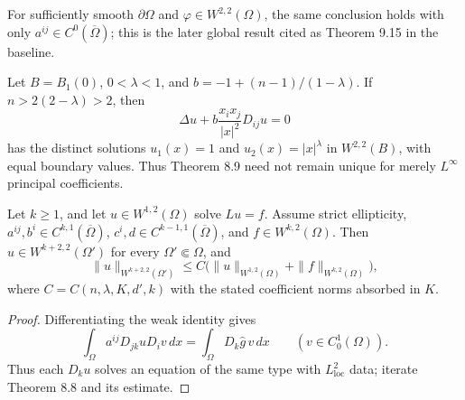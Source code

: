 \begin{remark}
\label{gt-rem-8-continuous-principal-coefficients}
For sufficiently smooth $\partial\Omega$ and $\varphi\in W^{2,2}(\Omega)$,
the same conclusion holds with only $a^{ij}\in C^0(\overline\Omega)$; this is
the later global result cited as Theorem 9.15 in the baseline.
\end{remark}

\begin{example}
\label{gt-ex-8-discontinuous-principal-nonuniqueness}
Let $B=B_1(0)$, $0<\lambda<1$, and
$b=-1+(n-1)/(1-\lambda)$. If $n>2(2-\lambda)>2$, then
\begin{equation}
\Delta u+b\frac{x_ix_j}{|x|^2}D_{ij}u=0
\tag{8.22}
\end{equation}
has the distinct solutions $u_1(x)=1$ and $u_2(x)=|x|^\lambda$ in
$W^{2,2}(B)$, with equal boundary values. Thus Theorem 8.9 need not remain
unique for merely $L^\infty$ principal coefficients.
\end{example}

\begin{theorem}
\label{gt-thm-8-10-higher-interior-regularity}
Let $k\geq1$, and let $u\in W^{1,2}(\Omega)$ solve $Lu=f$. Assume strict
ellipticity, $a^{ij},b^i\in C^{k,1}(\overline\Omega)$,
$c^i,d\in C^{k-1,1}(\overline\Omega)$, and $f\in W^{k,2}(\Omega)$.
Then $u\in W^{k+2,2}(\Omega')$ for every $\Omega'\Subset\Omega$, and
\begin{equation}
\|u\|_{W^{k+2,2}(\Omega')}
\leq C\bigl(\|u\|_{W^{1,2}(\Omega)}+\|f\|_{W^{k,2}(\Omega)}\bigr),
\tag{8.24}
\end{equation}
where $C=C(n,\lambda,K,d',k)$ with the stated coefficient norms absorbed in $K$.
\end{theorem}
\begin{proof}
\sketch Differentiating the weak identity gives
\begin{equation}
\tag{8.23}
\int_\Omega a^{ij}D_{jk}uD_i v\,dx
=\int_\Omega D_k\widehat g\,v\,dx
\qquad(v\in C_0^1(\Omega)).
\end{equation}
Thus each $D_ku$ solves an equation of the
same type with $L^2_{\mathrm{loc}}$ data; iterate Theorem 8.8 and its estimate.
\end{proof}

